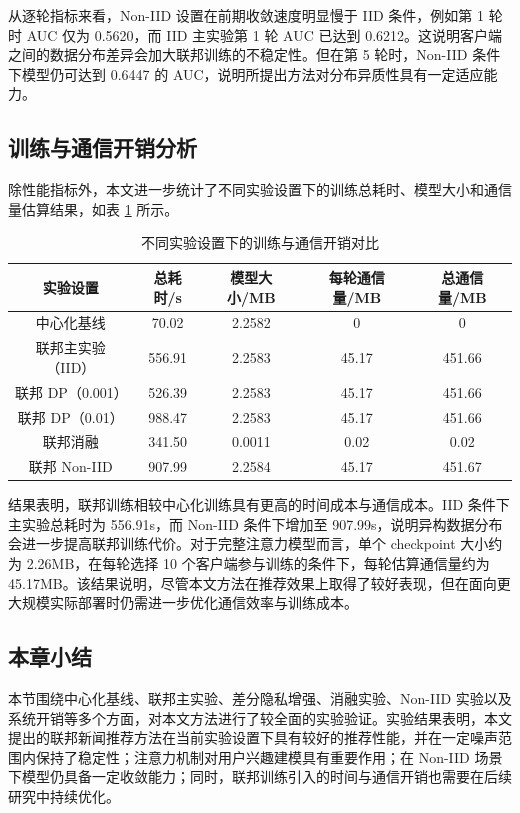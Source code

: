 \documentclass[UTF8,a4paper,12pt]{ctexart}
\numberwithin{equation}{section}
\begin{document}
从逐轮指标来看，Non-IID 设置在前期收敛速度明显慢于 IID 条件，例如第 1 轮时 AUC 仅为 0.5620，而 IID 主实验第 1 轮 AUC 已达到 0.6212。这说明客户端之间的数据分布差异会加大联邦训练的不稳定性。但在第 5 轮时，Non-IID 条件下模型仍可达到 0.6447 的 AUC，说明所提出方法对分布异质性具有一定适应能力。

\subsection{训练与通信开销分析}
除性能指标外，本文进一步统计了不同实验设置下的训练总耗时、模型大小和通信量估算结果，如表 \ref{tab:overhead} 所示。

\begin{table}[H]
\centering
\caption{不同实验设置下的训练与通信开销对比}
\label{tab:overhead}
\small
\begin{tabular}{ccccc}
\toprule
实验设置 & 总耗时/s & 模型大小/MB & 每轮通信量/MB & 总通信量/MB \\
\midrule
中心化基线 & 70.02 & 2.2582 & 0 & 0 \\
联邦主实验（IID） & 556.91 & 2.2583 & 45.17 & 451.66 \\
联邦 DP（0.001） & 526.39 & 2.2583 & 45.17 & 451.66 \\
联邦 DP（0.01） & 988.47 & 2.2583 & 45.17 & 451.66 \\
联邦消融 & 341.50 & 0.0011 & 0.02 & 0.02 \\
联邦 Non-IID & 907.99 & 2.2584 & 45.17 & 451.67 \\
\bottomrule
\end{tabular}
\end{table}

结果表明，联邦训练相较中心化训练具有更高的时间成本与通信成本。IID 条件下主实验总耗时为 556.91s，而 Non-IID 条件下增加至 907.99s，说明异构数据分布会进一步提高联邦训练代价。对于完整注意力模型而言，单个 checkpoint 大小约为 2.26MB，在每轮选择 10 个客户端参与训练的条件下，每轮估算通信量约为 45.17MB。该结果说明，尽管本文方法在推荐效果上取得了较好表现，但在面向更大规模实际部署时仍需进一步优化通信效率与训练成本。

\subsection{本章小结}
本节围绕中心化基线、联邦主实验、差分隐私增强、消融实验、Non-IID 实验以及系统开销等多个方面，对本文方法进行了较全面的实验验证。实验结果表明，本文提出的联邦新闻推荐方法在当前实验设置下具有较好的推荐性能，并在一定噪声范围内保持了稳定性；注意力机制对用户兴趣建模具有重要作用；在 Non-IID 场景下模型仍具备一定收敛能力；同时，联邦训练引入的时间与通信开销也需要在后续研究中持续优化。
\end{document}

